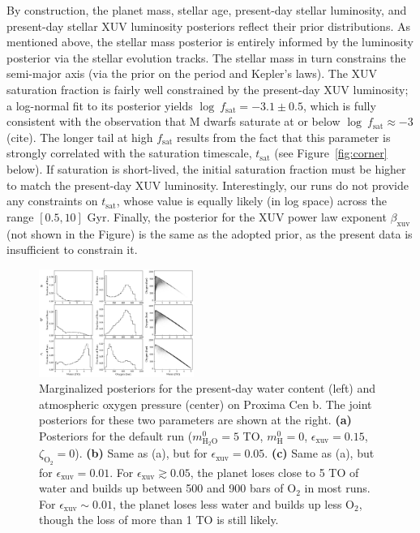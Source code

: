\documentclass[]{emulateapj}
\newcommand{\note}[1]{{\color{red} #1}}
\newcommand{\cn}{\note{(cite)}}
\begin{document}
By construction, the planet mass, stellar age, present-day stellar luminosity, and present-day stellar XUV luminosity posteriors reflect
their prior distributions. As mentioned above, the stellar mass posterior is entirely informed by the luminosity posterior via the
\cite{YonseiYale13} stellar evolution tracks. The stellar mass in turn constrains the semi-major axis (via the prior on the period and
Kepler's laws). The XUV saturation fraction is fairly well constrained by the present-day XUV luminosity; a log-normal fit
to its posterior yields $\log\ f_\mathrm{sat} = -3.1 \pm 0.5$, which is fully consistent with the observation that M dwarfs
saturate at or below $\log\ f_\mathrm{sat} \approx -3$ \cn. The longer tail at high $f_\mathrm{sat}$ results from the fact that
this parameter is strongly correlated with the saturation timescale, $t_\mathrm{sat}$ (see Figure~\ref{fig:corner} below). If
saturation is short-lived, the initial saturation fraction must be higher to match the present-day XUV luminosity. Interestingly,
our runs do not provide any constraints on $t_\mathrm{sat}$, whose value is equally likely (in log space) across the range 
$[0.5, 10]$ Gyr. Finally, the posterior for the XUV power law exponent $\beta_\mathrm{xuv}$ (not shown in the Figure) is 
the same as the adopted prior, as the present data is insufficient to constrain it.

\begin{figure}[hbt]
  \begin{center}
      \includegraphics[width=0.45\textwidth]{figures/planet_epsilon.pdf}
       \caption{Marginalized posteriors for the present-day water content (left) and atmospheric oxygen
       pressure (center) on Proxima Cen b. The joint posteriors for these two parameters are shown at the 
       right. \textbf{(a)} Posteriors for the default run ($m_\mathrm{H_2O}^0 = 5$ TO, $m_\mathrm{H}^0 = 0$,
       $\epsilon_\mathrm{xuv} = 0.15$, $\zeta_\mathrm{O_2} = 0$). \textbf{(b)} Same as (a), but for
       $\epsilon_\mathrm{xuv} = 0.05$. \textbf{(c)} Same as (a), but for
       $\epsilon_\mathrm{xuv} = 0.01$. For $\epsilon_\mathrm{xuv} \gtrsim 0.05$, the planet loses close to
       5 TO of water and builds up between 500 and 900 bars of O$_2$ in most runs. For $\epsilon_\mathrm{xuv} \sim 0.01$,
       the planet loses less water and builds up less O$_2$, though the loss of more than 1 TO is still likely.
       }
     \label{fig:planet_epsilon}
  \end{center}
\end{figure}
\end{document}
